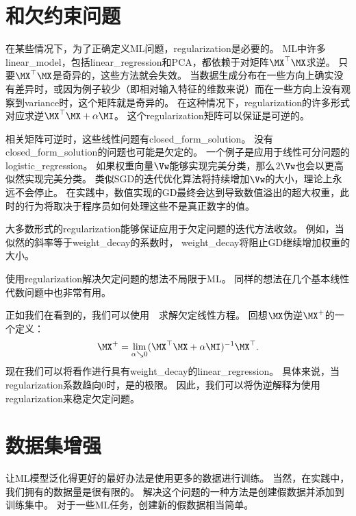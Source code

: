 \section{和欠约束问题}
\label{sec:regularization_and_under_constrained_problems}
在某些情况下，为了正确定义\gls{ML}问题，\gls{regularization}是必要的。
\gls{ML}中许多\gls{linear_model}，包括\gls{linear_regression}和PCA，都依赖于对矩阵$\MX^\top\MX$求逆。
只要$\MX^\top\MX$是奇异的，这些方法就会失效。
当数据生成分布在一些方向上确实没有差异时，或因为例子较少（即相对输入特征的维数来说）而在一些方向上没有观察到\gls{variance}时，这个矩阵就是奇异的。
在这种情况下，\gls{regularization}的许多形式对应求逆$\MX^\top\MX + \alpha \MI$。
这个\gls{regularization}矩阵可以保证是可逆的。

相关矩阵可逆时，这些线性问题有\gls{closed_form_solution}。
没有\gls{closed_form_solution}的问题也可能是欠定的。
一个例子是应用于线性可分问题的\gls{logistic_regression}。
如果权重向量$\Vw$能够实现完美分类，那么$2 \Vw$也会以更高似然实现完美分类。
类似\gls{SGD}的迭代优化算法将持续增加$\Vw$的大小，理论上永远不会停止。
在实践中，数值实现的\gls{GD}最终会达到导致数值溢出的超大权重，此时的行为将取决于程序员如何处理这些不是真正数字的值。

大多数形式的\gls{regularization}能够保证应用于欠定问题的迭代方法收敛。
例如，当似然的斜率等于\gls{weight_decay}的系数时， \gls{weight_decay}将阻止\gls{GD}继续增加权重的大小。

使用\gls{regularization}解决欠定问题的想法不局限于\gls{ML}。
同样的想法在几个基本线性代数问题中也非常有用。


正如我们在看到的，我们可以使用~~求解欠定线性方程。 
回想$\MX$伪逆$\MX^+$的一个定义：
\begin{align} 
\label{eq:729pseudo}
 \MX^+ = \lim_{\alpha \searrow 0} (\MX^\top \MX + \alpha \MI)^{-1}\MX^\top.
\end{align}
现在我们可以将看作进行具有\gls{weight_decay}的\gls{linear_regression}。
具体来说，当\gls{regularization}系数趋向0时，是的极限。
因此，我们可以将伪逆解释为使用\gls{regularization}来稳定欠定问题。


\section{数据集增强}
\label{sec:dataset_augmentation_chap7}
让\gls{ML}模型泛化得更好的最好办法是使用更多的数据进行训练。
当然，在实践中，我们拥有的数据量是很有限的。
解决这个问题的一种方法是创建假数据并添加到训练集中。
对于一些\gls{ML}任务，创建新的假数据相当简单。

